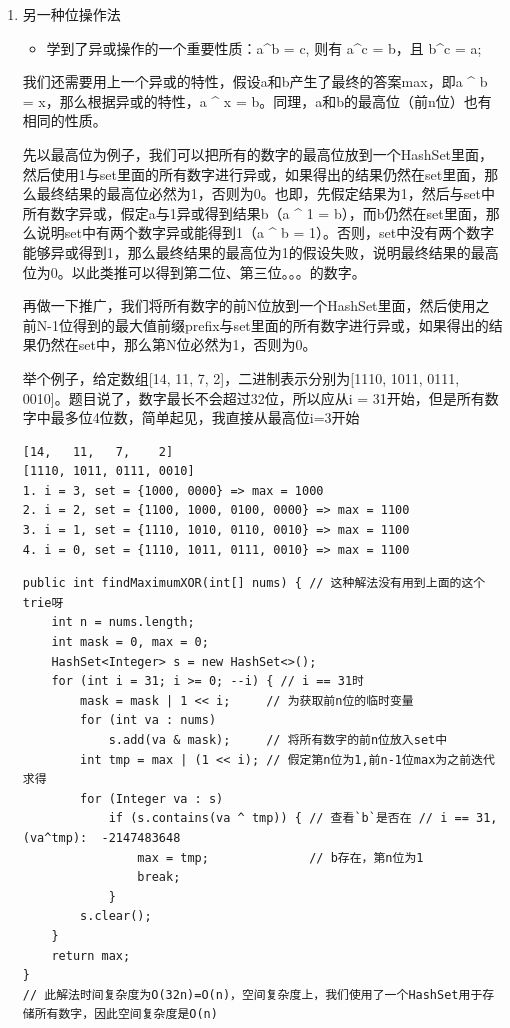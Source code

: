 \documentclass[9pt, b5paaper]{book}
\begin{document}
\begin{enumerate}
\item 另一种位操作法
\label{sec-2-1-5-1}

\begin{itemize}
\item 学到了异或操作的一个重要性质：a\^{}b = c, 则有 a\^{}c = b，且 b\^{}c = a;
\end{itemize}

我们还需要用上一个异或的特性，假设a和b产生了最终的答案max，即a \^{} b = x，那么根据异或的特性，a \^{} x = b。同理，a和b的最高位（前n位）也有相同的性质。

先以最高位为例子，我们可以把所有的数字的最高位放到一个HashSet里面，然后使用1与set里面的所有数字进行异或，如果得出的结果仍然在set里面，那么最终结果的最高位必然为1，否则为0。也即，先假定结果为1，然后与set中所有数字异或，假定a与1异或得到结果b（a \^{} 1 = b），而b仍然在set里面，那么说明set中有两个数字异或能得到1（a \^{} b = 1）。否则，set中没有两个数字能够异或得到1，那么最终结果的最高位为1的假设失败，说明最终结果的最高位为0。以此类推可以得到第二位、第三位。。。的数字。

再做一下推广，我们将所有数字的前N位放到一个HashSet里面，然后使用之前N-1位得到的最大值前缀prefix与set里面的所有数字进行异或，如果得出的结果仍然在set中，那么第N位必然为1，否则为0。

举个例子，给定数组[14, 11, 7, 2]，二进制表示分别为[1110, 1011, 0111, 0010]。题目说了，数字最长不会超过32位，所以应从i = 31开始，但是所有数字中最多位4位数，简单起见，我直接从最高位i=3开始
\begin{verbatim}
[14,   11,   7,    2]
[1110, 1011, 0111, 0010]
1. i = 3, set = {1000, 0000} => max = 1000
2. i = 2, set = {1100, 1000, 0100, 0000} => max = 1100
3. i = 1, set = {1110, 1010, 0110, 0010} => max = 1100
4. i = 0, set = {1110, 1011, 0111, 0010} => max = 1100
\end{verbatim}
\begin{verbatim}
public int findMaximumXOR(int[] nums) { // 这种解法没有用到上面的这个trie呀
    int n = nums.length;
    int mask = 0, max = 0;
    HashSet<Integer> s = new HashSet<>();
    for (int i = 31; i >= 0; --i) { // i == 31时
        mask = mask | 1 << i;     // 为获取前n位的临时变量     
        for (int va : nums) 
            s.add(va & mask);     // 将所有数字的前n位放入set中
        int tmp = max | (1 << i); // 假定第n位为1,前n-1位max为之前迭代求得
        for (Integer va : s) 
            if (s.contains(va ^ tmp)) { // 查看`b`是否在 // i == 31, (va^tmp):  -2147483648
                max = tmp;              // b存在，第n位为1
                break;
            }
        s.clear();
    }
    return max;
}
// 此解法时间复杂度为O(32n)=O(n)，空间复杂度上，我们使用了一个HashSet用于存储所有数字，因此空间复杂度是O(n)
\end{verbatim}
\end{enumerate}
\end{document}
